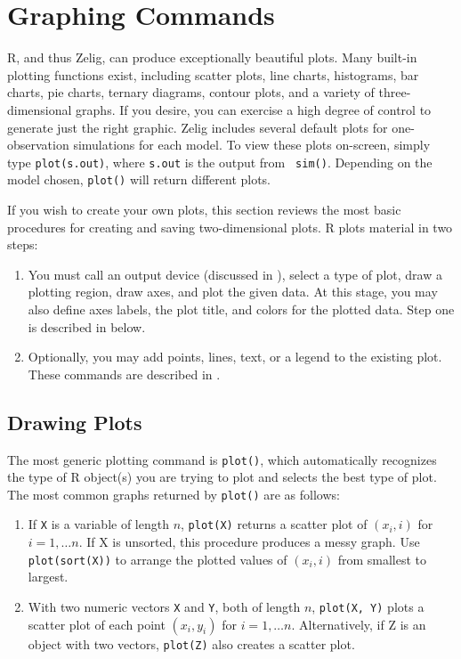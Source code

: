 \chapter{Graphing Commands}\label{s:plot}

R, and thus Zelig, can produce exceptionally beautiful plots.  Many
built-in plotting functions exist, including scatter plots, line
charts, histograms, bar charts, pie charts, ternary diagrams, contour
plots, and a variety of three-dimensional graphs.  If you desire, you
can exercise a high degree of control to generate just the right
graphic.  Zelig includes several default plots for one-observation
simulations for each model.  To view these plots on-screen, simply
type {\tt plot(s.out)}, where {\tt s.out} is the output from {\tt
  sim()}.  Depending on the model chosen, {\tt plot()} will return
different plots.

If you wish to create your own plots, this section reviews the most
basic procedures for creating and saving two-dimensional plots.  R
plots material in two steps:  
\begin{enumerate}
\item You must call an output device (discussed in ),
  select a type of plot, draw a plotting region, draw axes, and plot
  the given data.  At this stage, you may also define axes labels, the
  plot title, and colors for the plotted data.  Step one is described
  in  below.
\item Optionally, you may add points, lines, text, or a legend to the
  existing plot.  These commands are described in .
\end{enumerate}

\section{Drawing Plots}\label{ss:draw}

The most generic plotting command is \texttt{plot()}, which
automatically recognizes the type of R object(s) you are trying to
plot and selects the best type of plot.  The most common graphs
returned by \texttt{plot()} are as follows:
\begin{enumerate}
\item If \texttt{X} is a variable of length $n$, \texttt{plot(X)}
  returns a scatter plot of $(x_i, i)$ for $i = 1, \dots n$.  If X is
  unsorted, this procedure produces a messy graph.  Use
  \texttt{plot(sort(X))} to arrange the plotted values of $(x_i, i)$
  from smallest to largest.
\item With two numeric vectors \texttt{X} and \texttt{Y}, both of
  length $n$, \texttt{plot(X, Y)} plots a scatter plot of each point
  $(x_i, y_i)$ for $i = 1, \dots n$.  Alternatively, if Z is an object
  with two vectors, \texttt{plot(Z)} also creates a scatter plot.
\end{enumerate}

